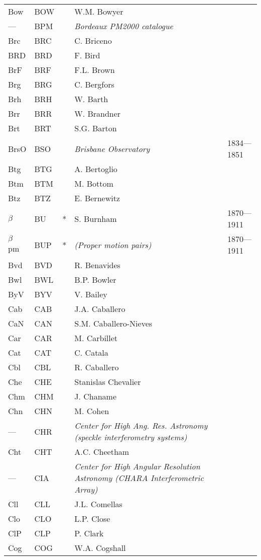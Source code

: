 \begin{longtable}{l|l|c|p{59mm}|l}
Bow & BOW &   & W.M. Bowyer & \\
--- & BPM &   & \emph{Bordeaux PM2000 catalogue} & \\
Brc & BRC &   & C. Briceno & \\
BRD & BRD &   & F. Bird & \\
BrF & BRF &   & F.L. Brown & \\
Brg & BRG &   & C. Bergfors & \\
Brh & BRH &   & W. Barth & \\
Brr & BRR &   & W. Brandner & \\
Brt & BRT &   & S.G. Barton & \\
BrsO & BSO &   & \emph{Brisbane Observatory} & 1834---1851 \\
Btg & BTG &   & A. Bertoglio & \\
Btm & BTM &   & M. Bottom & \\
Btz & BTZ &   & E. Bernewitz & \\
$\beta$ & BU  & * & S. Burnham & 1870---1911 \\
$\beta$ pm & BUP & * & \emph{(Proper motion pairs)} & 1870---1911 \\
Bvd & BVD &   & R. Benavides & \\
Bwl & BWL &   & B.P. Bowler & \\
ByV & BYV &   & V. Bailey & \\\midrule
Cab & CAB &   & J.A. Caballero & \\
CaN & CAN &   & S.M. Caballero-Nieves & \\
Car & CAR &   & M. Carbillet & \\
Cat & CAT &   & C. Catala & \\
Cbl & CBL &   & R. Caballero & \\
Che & CHE &   & Stanislas Chevalier & \\
Chm & CHM &   & J. Chaname & \\
Chn & CHN &   & M. Cohen & \\
--- & CHR &   & \emph{Center for High Ang. Res. Astronomy (speckle interferometry systems)} & \\
Cht & CHT &   & A.C. Cheetham & \\
--- & CIA &   & \emph{Center for High Angular Resolution Astronomy (CHARA Interferometric Array)} & \\
Cll & CLL &   & J.L. Comellas & \\
Clo & CLO &   & L.P. Close & \\
ClP & CLP &   & P. Clark & \\
Cog & COG &   & W.A. Cogshall & \\

\end{longtable}
